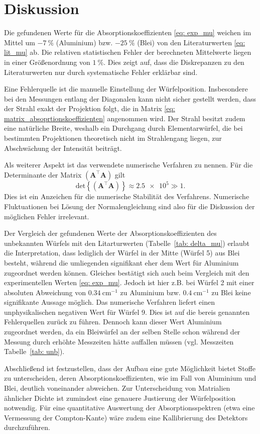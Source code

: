 \section{Diskussion}
Die gefundenen Werte für die Absorptionskoeffizienten \eqref{eq: exp_mu} weichen im Mittel
um $\SI{-7}{\percent}$ (Aluminium) bzw. $\SI{-25}{\percent}$ (Blei) von den Literaturwerten \eqref{eq: lit_mu} ab.
Die relativen statistischen Fehler der berechneten Mittelwerte liegen in einer Größenordnung von
$\SI{1}{\percent}$. Dies zeigt auf, dass die Diskrepanzen zu den Literaturwerten nur durch
systematische Fehler erklärbar sind.

Eine Fehlerquelle ist die manuelle Einstellung der Würfelposition. Insbesondere bei den Messungen
entlang der Diagonalen kann nicht sicher gestellt werden, dass der Strahl exakt der Projektion folgt,
die in Matrix \eqref{eq: matrix_absoprtionskoeffizienten} angenommen wird. Der Strahl besitzt zudem eine natürliche Breite, weshalb
ein Durchgang durch Elementarwürfel, die bei bestimmten Projektionen theoretisch nicht im Strahlengang liegen, zur
Abschwächung der Intensität beiträgt.

Als weiterer Aspekt ist das verwendete numerische Verfahren zu nennen. Für die Determinante der Matrix
$\left(\symbf{A}^\top \symbf{A}\right)$ gilt
\begin{equation}
  \mathup{det}\left\{\left(\symbf{A}^\top \symbf{A}\right)\right\} \approx \num{2.5e5} \gg 1.
\end{equation}
Dies ist ein Anzeichen für die numerische Stabilität des Verfahrens. Numerische Fluktuationen bei
Lösung der Normalengleichung sind also für die Diskussion der möglichen Fehler irrelevant.

Der Vergleich der gefundenen Werte der Absorptionskoeffizienten des unbekannten Würfels mit den
Litarturwerten (Tabelle~\ref{tab: delta_mu}) erlaubt die Interpretation, dass lediglich der
Würfel in der Mitte (Würfel 5) aus Blei besteht, während die umliegenden signifikant eher dem Wert
für Aluminium zugeordnet werden können. Gleiches bestätigt sich auch beim Vergleich mit den experimentellen
Werten \eqref{eq: exp_mu}. Jedoch ist hier z.B. bei Würfel 2 mit einer absoluten Abweichung von $\SI{0.34}{\centi\meter^{-1}}$ zu Aluminium
bzw. $\SI{0.4}{\centi\meter^{-1}}$ zu Blei keine signifikante Aussage möglich. Das numerische Verfahren liefert einen unphysikalischen
negativen Wert für Würfel 9. Dies ist auf die bereis genannten Fehlerquellen zurück zu führen.
Dennoch kann dieser Wert Aluminium zugeordnet werden, da ein Bleiwürfel an der selben Stelle schon während
der Messung durch erhöhte Messzeiten hätte auffallen müssen (vgl. Messzeiten Tabelle~\ref{tab: unb}).

Abschließend ist festzustellen, dass der Aufbau eine gute Möglichkeit bietet Stoffe zu unterscheiden, deren
Absorptionskoeffizienten, wie im Fall von Aluminium und Blei, deutlich voneinander abweichen. Zur Unterscheidung
von Matrialien ähnlicher Dichte ist zumindest eine genauere Justierung der Würfelposition notwendig.
Für eine quantitative Auswertung der Absorptionsspektren (etwa eine Vermessung der Compton-Kante) wäre zudem eine
Kallibrierung des Detektors durchzuführen.

